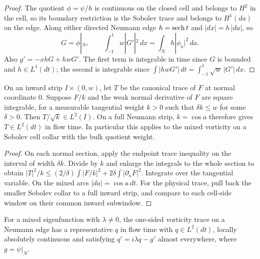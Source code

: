 \begin{proof}
\leanok
The quotient $\phi=\psi/h$ is continuous on the closed cell and belongs to
$H^2$ in the cell, so its boundary restriction is the Sobolev trace
and belongs to $H^1(da)$ on the edge.
Along either directed Neumann edge $h=\operatorname{sech} t$ and $|dx|=h\,|da|$, so
\[
 G=\phi|_N,\qquad \int_{-1}^1w|G'|^2\,dx=\int_N h|\phi_a|^2\,da.
\]
Also $g'=-xhG+hwG'$. The first term is integrable in time since $G$ is
bounded and $h\in L^1(dt)$; the second is integrable since
$\int |hwG'|\,dt=\int_{-1}^1\sqrt w\,|G'|\,dx$.
\end{proof}

\begin{lemma}
\label{lem:mixed-neumann-strip-weight}
\leanok
On an inward strip $I\times(0,w)$, let $T$ be the canonical trace
of $F$ at normal coordinate $0$. Suppose $F/k$ and the weak normal
derivative of $F$ are square integrable, for a measurable tangential
weight $k>0$ such that $\delta k\le w$ for some $\delta>0$.
Then $T/\sqrt{k}\in L^2(I)$. On a full Neumann strip, $k=\cos a$
therefore gives $T\in L^2(dt)$ in flow time. In particular this applies to
the mixed vorticity on a Sobolev cell collar with the bulk quotient weight.
\end{lemma}

\begin{proof}
\leanok
On each normal section, apply the endpoint trace inequality on the
interval of width $\delta k$. Divide by $k$ and enlarge the integrals
to the whole section to obtain
$|T|^2/k\le(2/\delta)\int|F/k|^2+2\delta\int|\partial_nF|^2$.
Integrate over the tangential variable. On the mixed arcs $|da|=\cos a\,dt$.
For the physical trace, pull back the smaller Sobolev collar to a full
inward strip, and compare to each cell-side window on their common
inward subwindow.
\end{proof}

\begin{lemma}
\label{lem:mixed-neumann-vorticity-trace}
\leanok
For a mixed eigenfunction with $\lambda\ne0$, the one-sided vorticity trace
on a Neumann edge has a representative $q$ in flow time with $q\in L^2(dt)$,
locally absolutely continuous and satisfying $q'=i\lambda q-g'$ almost
everywhere, where $g=\psi|_N$.
\end{lemma}

